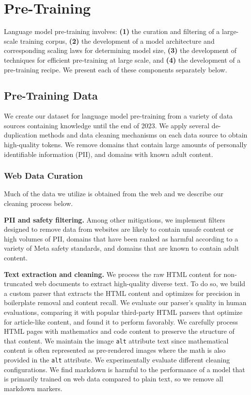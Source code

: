 \section{Pre-Training}
\label{section:pretraining}

Language model pre-training involves: \textbf{(1)} the curation and filtering of a large-scale training corpus, \textbf{(2)} the development of a model architecture and corresponding scaling laws for determining model size, \textbf{(3)} the development of techniques for efficient pre-training at large scale, and \textbf{(4)} the development of a pre-training recipe. We present each of these components separately below.

\providecommand{\llama}[1]{\textsc{Llama #1}}

\subsection{Pre-Training Data}
\label{section:pretraining_data}

We create our dataset for language model pre-training from a variety of data sources containing knowledge until the end of 2023. We apply several de-duplication methods and data cleaning mechanisms on each data source to obtain high-quality tokens. We remove domains that contain large amounts of personally identifiable information (PII), and domains with known adult content. 

\subsubsection{Web Data Curation} Much of the data we utilize is obtained from the web and we describe our cleaning process below. 

\textbf{PII and safety filtering.} Among other mitigations, we implement filters designed to remove data from websites are likely to contain unsafe content or high volumes of PII, domains that have been ranked as harmful according to a variety of Meta safety standards, and domains that are known to contain adult content.

\textbf{Text extraction and cleaning.} We process the raw HTML content for non-truncated web documents to extract high-quality diverse text. To do so, we build a custom parser that extracts the HTML content and optimizes for precision in boilerplate removal and content recall. We evaluate our parser's quality in human evaluations, comparing it with popular third-party HTML parsers that optimize for article-like content, and found it to perform favorably. We carefully process HTML pages with mathematics and code content to preserve the structure of that content. We maintain the image \texttt{alt} attribute text since mathematical content is often represented as pre-rendered images where the math is also provided in the \texttt{alt} attribute. We experimentally evaluate different cleaning configurations. We find markdown is harmful to the performance of a model that is primarily trained on web data compared to plain text, so we remove all markdown markers.

